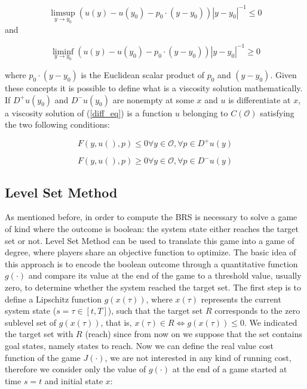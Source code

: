 \begin{equation}
	\limsup_{y \to y_0} (u(y)-u(y_0)-p_0 \cdot (y-y_0)) |y-y_0|^{-1} \leq 0
\end{equation}
and

\begin{equation}
	\liminf_{y \to y_0} (u(y)-u(y_0)-p_0 \cdot (y-y_0)) |y-y_0|^{-1} \geq 0
\end{equation}

where $p_0 \cdot (y-y_0)$ is the Euclidean scalar product of $p_0$ and $(y-y_0)$. 
Given these concepts it is possible to define what is a viscosity solution mathematically. 
If $D^+u(y_0)$ and $D^-u(y_0)$ are nonempty at some $x$ and $u$ is differentiate at $x$, a viscosity solution of (\ref{diff_eq}) is a function $u$ belonging to $C(\mathcal{O})$ satisfying the two following conditions:

\begin{equation}
	F(y,u(),p)\leq 0 \forall y \in \mathcal{O}, \forall p \in D^+ u(y)
\end{equation}

\begin{equation}
	F(y,u(),p)\geq 0 \forall y \in \mathcal{O}, \forall p \in D^- u(y)
\end{equation}


\subsection{Level Set Method}
As mentioned before, in order to compute the BRS is necessary to solve a game of kind where the outcome is boolean: the system state either reaches the target set or not. Level Set Method can be used to translate this game into a game of degree, where players share an objective function to optimize. The basic idea of this approach is to encode the boolean outcome through a quantitative function $g(\cdot)$ and compare its value at the end of the game to a threshold value, usually zero, to determine whether the system reached the target set.
The first step is to define a Lipschitz function $g(x(\tau))$, where $x(\tau)$ represents the current system state ($s=\tau\in[t, T]$), such that the target set $R$ corresponds to the zero sublevel set of $g(x(\tau))$, that is, $x(\tau)\in R \Leftrightarrow g(x(\tau)) \leq 0$. We indicated the target set with $R$ (reach) since from now on we suppose that the set contains goal states, namely states to reach. Now we can define the real value cost function of the game $J(\cdot)$, we are not interested in any kind of running cost, therefore we consider only the value of $g(\cdot)$ at the end of a game started at time $s=t$ and initial state $x$:

